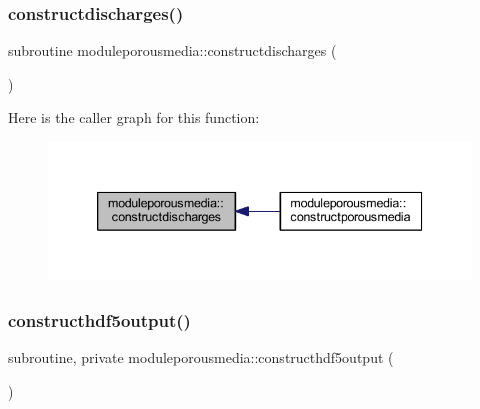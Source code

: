 \subsubsection{\texorpdfstring{constructdischarges()}{constructdischarges()}}
{\footnotesize\ttfamily subroutine moduleporousmedia\+::constructdischarges (\begin{DoxyParamCaption}{ }\end{DoxyParamCaption})\hspace{0.3cm}{\ttfamily [private]}}

Here is the caller graph for this function\+:\nopagebreak
\begin{figure}[H]
\begin{center}
\leavevmode
\includegraphics[width=339pt]{namespacemoduleporousmedia_ac4e498c09f58d0ecca6f79a2a268bb84_icgraph}
\end{center}
\end{figure}
\mbox{\label{namespacemoduleporousmedia_a222cfa7f29b1db2fb4ab637f6c27c28e}} 
\subsubsection{\texorpdfstring{constructhdf5output()}{constructhdf5output()}}
{\footnotesize\ttfamily subroutine, private moduleporousmedia\+::constructhdf5output (\begin{DoxyParamCaption}{ }\end{DoxyParamCaption})\hspace{0.3cm}{\ttfamily [private]}}

